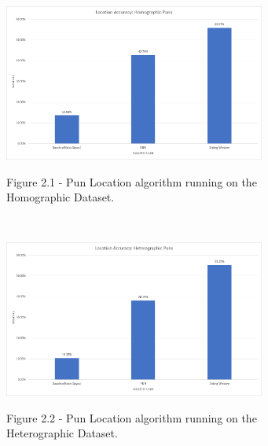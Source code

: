 \documentclass[final]{beamer}
\newlength{\sepwid}
\newlength{\onecolwid}
\newlength{\twocolwid}
\begin{document}
\begin{frame}[t]
\begin{columns}[t]
\begin{column}{\twocolwid}
\begin{columns}[t,totalwidth=\twocolwid]
\begin{column}{\onecolwid}
					\begin{figure}
					\includegraphics[width=0.85\textwidth]{HomographicLocation.png}\\
					\caption{Figure 2.1 - Pun Location algorithm running on the Homographic Dataset.}
					\end{figure}
					\\
					\vspace{20mm}
					\begin{figure}
					\includegraphics[width=0.85\textwidth]{HeterographicLocation.png}\\
					\caption{Figure 2.2 - Pun Location algorithm running on the Heterographic Dataset.}
					\end{figure}
				\end{column} %
			\end{columns}
		\end{column}
		\begin{column}{\sepwid}\end{column} %
		\begin{column}{\onecolwid}
            

\end{column}
\end{columns}
\end{frame}
\end{document}
